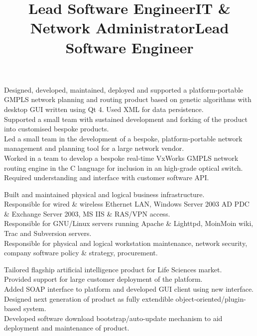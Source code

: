 \documentclass{resume}
\begin{document}
\begin{resume}
\title{\bf{Lead Software Engineer}}
\begin{position}
Designed, developed, maintained, deployed and supported a platform-portable GMPLS network planning and routing product based on genetic algorithms with desktop GUI written using Qt 4.  Used XML for data persistence.\vspace{1mm}\\
Supported a small team with sustained development and forking of the product into customised bespoke products.\vspace{1mm}\\
Led a small team in the development of a bespoke, platform-portable network management and planning tool for a large network vendor.\vspace{1mm}\\
Worked in a team to develop a bespoke real-time VxWorks GMPLS network routing engine in the C language for inclusion in an high-grade optical switch.  Required understanding and interface with customer software API.
\end{position}

\title{\bf IT \& Network Administrator}
\begin{position}
Built and maintained physical and logical business infrastructure.\vspace{1mm}\\
Responsible for wired \& wireless Ethernet LAN, Windows Server 2003 AD PDC \& Exchange Server 2003, MS IIS \& RAS/VPN access.\vspace{1mm}\\
Responsible for GNU/Linux servers running Apache \& Lighttpd, MoinMoin wiki, Trac and Subversion servers.\vspace{1mm}\\
Responsible for physical and logical workstation maintenance, network security, company software policy \& strategy, procurement.
\end{position}

\title{\bf Lead Software Engineer}
\begin{position}
Tailored flagship artificial intelligence product for Life Sciences market.\vspace{1mm}\\
Provided support for large customer deployment of the platform.\vspace{1mm}\\
Added SOAP interface to platform and developed GUI client using new interface.\vspace{1mm}\\
Designed next generation of product as fully extendible object-oriented/plugin-based system.\vspace{1mm}\\
Developed software download bootstrap/auto-update mechanism to aid deployment and maintenance of product.
\end{position}


\end{resume}
\end{document}

